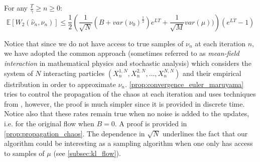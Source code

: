 \begin{theorem}\label{prop:convergence_euler_maruyama}
	For any $\frac{T}{\gamma}\geq n\geq 0$:
\[
\mathbb{E}[W_{2}(\hat{\nu}_{n},\nu_{n})]\leq \frac{1}{2}\left(\frac{1}{\sqrt{N}}(B+var(\nu_{0})^{\frac{1}{2}})e^{LT}+\frac{1}{\sqrt{M}}var(\mu))\right)(e^{LT}-1)
\]
\end{theorem}
Notice that since we do not have access to true samples of $\nu_n$ at each iteration $n$, we have adopted the common approach (sometimes referred to as \textit{mean-field interaction} in mathematical physics and stochastic analysis) which considers the system of  $N$ interacting particles $(X_n^{1,N}, X_n^{2,N}, \dots, X_n^{N,N})$ and their empirical distribution in order to approximate $\nu_n$.
\cref{prop:convergence_euler_maruyama} tries to control the propagation of the chaos at each iteration and uses techniques from \cite{Jourdain:2007}, however, the proof is much simpler since it is provided in discrete time. Notice also that these rates remain true when no noise is added to the updates, i.e. for the original flow when $B=0$. A proof is provided in \cref{prop:propagation_chaos}. The dependence in $\sqrt{N}$ underlines the fact that our algorithm could be interesting as a sampling algorithm when one only has access to samples of $\mu$ (see \cref{subsec:kl_flow}).

